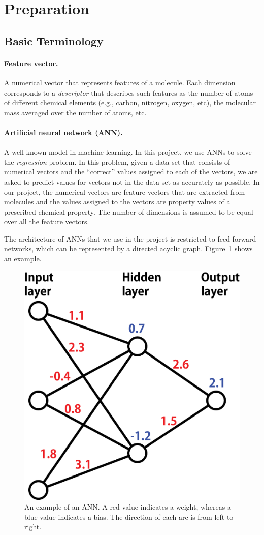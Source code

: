\documentclass[11pt, titlepage, dvipdfmx, twoside]{article}
\newcommand{\figref}[1]{Figure~\ref{fig:#1}}
\begin{document}
\newpage
\section{Preparation}
\label{sec:preparation}

\subsection{Basic Terminology}
\paragraph{Feature vector.}
A numerical vector that represents features of a molecule.
Each dimension corresponds to a {\em descriptor} that describes
such features as the number of atoms of different 
chemical elements (e.g., carbon, nitrogen, oxygen, etc), the molecular mass
averaged over the number of atoms, etc.

\paragraph{Artificial neural network (ANN).}
A well-known model in machine learning.
In this project, we use ANNs to solve the {\em regression} problem.
In this problem, given a data set that consists of numerical vectors
and the ``correct'' values assigned to each of the vectors,
we are asked to predict values for vectors not in the data set
as accurately as possible.
In our project, the numerical vectors are feature vectors
that are extracted from molecules
and the values assigned to the vectors are property values
of a prescribed chemical property.
The number of dimensions is assumed to be equal
over all the feature vectors. 

The architecture of ANNs that we use in the project
is restricted to feed-forward networks, which can be represented by
a directed acyclic graph. \figref{sample} shows an example. 

\begin{figure}[h!]
  \centering
  \includegraphics[width = 0.4 \textwidth]{./fig/ANN_sample_en}
  \caption{An example of an ANN.
    A red value indicates a weight, whereas
    a blue value indicates a bias.
    The direction of each arc is from left to right.}
  \label{fig:sample}
\end{figure}
\end{document}
